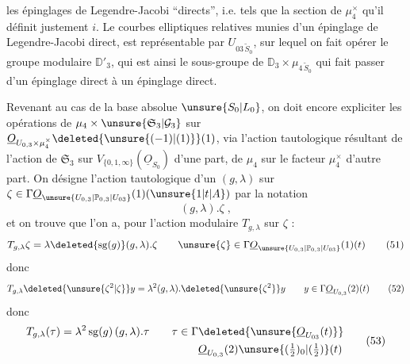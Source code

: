 les  épinglages de Legendre-Jacobi ``directs'', i.e. tels que la section de $\mu_4^\times$ qu'il définit  justement $i$.  Le  courbes elliptiques relatives  munies d'un épinglage de Legendre-Jacobi direct, est représentable par $U_{03\,\widetilde S_0}$, sur lequel on fait opérer le groupe modulaire $\mathbb D'_3$, qui est ainsi  le sous-groupe de $\mathbb D_3\times\mu_{4\,\widetilde S_0}$ qui fait passer d'un épinglage direct à un épinglage direct.

Revenant au cas de la base absolue $\unsure{S_0|L_0}$, on doit encore expliciter les opérations de $\mu_4\times\unsure{\mathfrak S_3|\mathcal G_3}$ sur $\underline O_{U_{0,3}\times\mu_4^\times}\deleted{\unsure{(-1)|(1)}}(1)$, via l'action tautologique résultant de l'action de $\mathfrak S_3$ sur $V_{\{0,1,\infty\}}(\underline O_{S_0})$ d'une part, de  $\mu_4$ sur le facteur $\mu_4^\times$ d'autre part. On désigne l'action tautologique d'un $(g,\lambda)$ sur $\zeta\in\Gamma\underline O_{\unsure{U_{0,3}|\mathbb P_{0,3}|U_{03}}}(1)(\unsure{1|t|A})$
 par la notation 
\[
(g,\lambda).\zeta\;,
\]
et on trouve que l'on a, pour l'action modulaire $T_{g,\lambda}$ sur $\zeta$ :
\[
T_{g,\lambda}\zeta=\lambda\deleted{\operatorname{sg}(g)}(g,\lambda).\zeta
\qquad \unsure{\zeta}\in\Gamma\underline O_{\unsure{U_{0,3}|\mathbb P_{0,3}|U_{03}}}(1)(t) \tag*{(51)}
\]
donc
\[
T_{g,\lambda}\deleted{\unsure{\zeta^2|\zeta}}y=\lambda^2(g,\lambda).\deleted{\unsure{\zeta^2}}y
\qquad y\in\Gamma\underline O_{U_{0,3}}(2)(t) \tag*{(52)}
\]
donc
\[
\begin{aligned}
T_{g,\lambda}(\tau)&=\lambda^2\operatorname{sg}(g)\,(g,\lambda).\tau
\qquad \tau\in\Gamma\deleted{\unsure{\underline O_{U_{03}}(t)}}\\
&\hphantom{{}=\lambda^2\operatorname{sg}(g)\,(g,\lambda).\tau\qquad \tau\in\Gamma}
\underline O_{U_{0,3}}(2)\unsure{(\tfrac12)_0|(\tfrac12)}(t)
\end{aligned} \tag*{(53)}
\]


